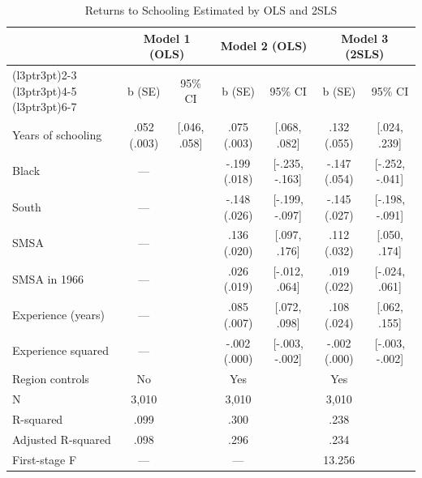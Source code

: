 \begin{table}[htbp]
\centering
\begin{threeparttable}
\caption{Returns to Schooling Estimated by OLS and 2SLS}
\label{tab:returns}
\footnotesize
\setlength{\tabcolsep}{4pt}

\begin{tabular}[t]{lcccccc}
\toprule
\multicolumn{1}{c}{\textbf{ }} & \multicolumn{2}{c}{\textbf{Model 1 (OLS)}} & \multicolumn{2}{c}{\textbf{Model 2 (OLS)}} & \multicolumn{2}{c}{\textbf{Model 3 (2SLS)}} \\
\cmidrule(l{3pt}r{3pt}){2-3} \cmidrule(l{3pt}r{3pt}){4-5} \cmidrule(l{3pt}r{3pt}){6-7}
\multicolumn{1}{c}{Variable} & b (SE) & 95\% CI & b (SE) & 95\% CI & b (SE) & 95\% CI\\
\midrule
Years of schooling & .052 (.003) & {}[.046, .058] & .075 (.003) & {}[.068, .082] & .132 (.055) & {}[.024, .239]\\
Black & --- &  & -.199 (.018) & {}[-.235, -.163] & -.147 (.054) & {}[-.252, -.041]\\
South & --- &  & -.148 (.026) & {}[-.199, -.097] & -.145 (.027) & {}[-.198, -.091]\\
SMSA & --- &  & .136 (.020) & {}[.097, .176] & .112 (.032) & {}[.050, .174]\\
SMSA in 1966 & --- &  & .026 (.019) & {}[-.012, .064] & .019 (.022) & {}[-.024, .061]\\
Experience (years) & --- &  & .085 (.007) & {}[.072, .098] & .108 (.024) & {}[.062, .155]\\
Experience squared & --- &  & -.002 (.000) & {}[-.003, -.002] & -.002 (.000) & {}[-.003, -.002]\\
Region controls & No &  & Yes &  & Yes & \\
N & 3,010 &  & 3,010 &  & 3,010 & \\
R-squared & .099 &  & .300 &  & .238 & \\
Adjusted R-squared & .098 &  & .296 &  & .234 & \\
First-stage F & --- &  & --- &  & 13.256 & \\
\bottomrule
\end{tabular}
\end{threeparttable}
\end{table}
